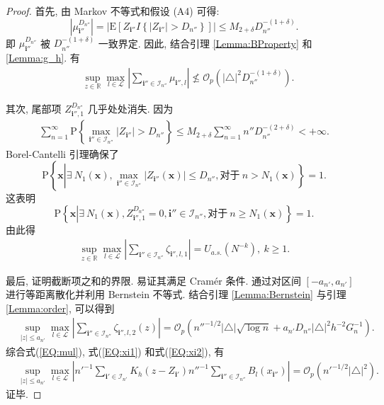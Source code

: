 \documentclass[a4paper,openay,14pt]{ctexbook}
\numberwithin{equation}{section}
\numberwithin{lem}{section}
\begin{document}
\begin{proof}
    首先, 由 Markov 不等式和假设 (A4) 可得:
    $$\left\vert \mu_{\mathbf{i}''}^{D_{n''}}\right \vert=\left \vert\mathrm{E}\left[Z_{\mathbf{i}''}I\left\{\vert Z_{\mathbf{i}''}\vert>D_{n''}\right\}\right]\right\vert \leq M_{2+\delta}D_{n''}^{-(1+\delta)}.$$
    即 $\mu_{\mathbf{i}''}^{D_{n''}}$ 被 $D_{n''}^{-(1+\delta)}$ 一致界定. 因此, 结合引理 \ref{Lemma:BProperty} 和 \ref{Lemma:g_h}. 有
    \begin{align}\label{EQ:mul}
        &\sup_{z\in\mathbb{R}}\max_{l\in\mathcal{L}}\left\vert \sum_{\mathbf{i}''\in\mathcal{I}_{n''}}\mu_{\mathbf{i}'',l}\right\vert\not \leq \mathcal{O}_p\left(\left \vert\triangle\right \vert^2D_{n''}^{-(1+\delta)}\right).
    \end{align}

    其次, 尾部项 $Z_{\mathbf{i}'',1}^{D_{n''}}$ 几乎处处消失. 因为
    \begin{align*}
    \sum_{n=1}^{\infty} \mathrm{P}\left\{\max_{\mathbf{i}''\in\mathcal{I}_{n''}}\vert Z_{\mathbf{i}''}\vert > D_{n''}\right\}\leq M_{2+\delta}\sum_{n=1}^{\infty}n''D_{n''}^{-(2+\delta)}<+\infty.
    \end{align*}
    Borel-Cantelli 引理确保了
    $$\mathrm{P}\left\{\boldsymbol{x}\left|\exists\: N_{1}\left(\boldsymbol{x}\right),\max\limits_{\mathbf{i}''\in\mathcal{I}_{n''}}\left|Z_{\mathbf{i}''}\left(\boldsymbol{\mathbf{x}}\right)\right|\leq D_{n''}, \text{对于}\:n>N_{1}\left(\boldsymbol{x}\right)\right\}=1.\right.$$
    这表明
    $$\mathrm{P}\left\{\boldsymbol{x}\left|\exists\:N_{1}\left(\boldsymbol{x}\right),Z_{\mathbf{i}'',1}^{D_{n''}}=0, \mathbf{i}''\in\mathcal{I}_{n''}, \text{对于} \:n\geq N_{1}\left(\boldsymbol{x}\right)\right\}=1.\right.$$
    由此得
    \begin{align}\label{EQ:xi1}
    \sup_{z\in\mathbb{R}}\max_{l\in\mathcal{L}}\left\vert\sum_{\mathbf{i}''\in\mathcal{I}_{n''}}\zeta_{\mathbf{i}'',l,1}\right\vert = U_{a.s.}\left(N^{-k}\right),~k\geq 1.
    \end{align}

    最后, 证明截断项之和的界限. 易证其满足 Cram{\'e}r 条件. 通过对区间 $[-a_{n'}, a_{n'}]$ 进行等距离散化并利用 Bernstein 不等式. 结合引理 \ref{Lemma:Bernstein} 与引理\ref{Lemma:order}, 可以得到
    \begin{align}\label{EQ:xi2}
        &\sup_{\vert z\vert\leq a_{n'}}\max_{l\in\mathcal{L}}\left\vert\sum_{\mathbf{i}''\in\mathcal{I}_{n''}}\zeta_{\mathbf{i}'',l,2}(z)\right\vert =\mathcal{O}_p\left(n''^{-1/2}\vert\triangle\vert\sqrt{\log{n}} + a_{n'}D_{n''}\vert\triangle\vert^{2}h^{-2}G_{n}^{-1}\right).
    \end{align}
    综合式(\ref{EQ:mul}), 式(\ref{EQ:xi1}) 和式(\ref{EQ:xi2}), 有
    \begin{align*}
        &\sup_{\vert z\vert\leq a_{n'}}\max_{l\in\mathcal{L}}\left\vert n'^{-1}\sum_{\mathbf{i}'\in\mathcal{I}_{n'}}K_h(z-Z_{\mathbf{i}'})n''^{-1}\sum_{\mathbf{i}''\in\mathcal{I}_{n''}}B_{l}\left(x_{\mathbf{i}''}\right)\right\vert
        = {\scriptstyle \mathcal{O}}_p\left(n'^{-1/2}\vert\triangle\vert^2\right).
    \end{align*}
    证毕.
\end{proof}
\end{document}
